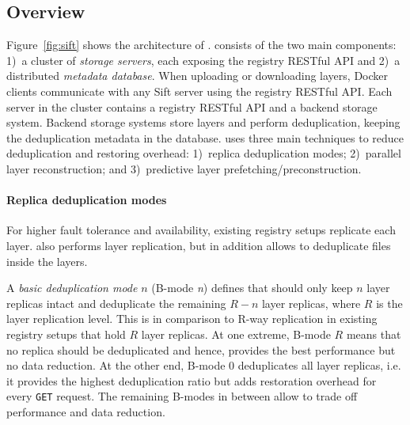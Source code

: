 \subsection{Overview}
\label{sec:overview}



Figure~\ref{fig:sift} shows the architecture of \sysname.
%
\sysname consists of the two main components: %
1)~a cluster of \emph{storage servers}, each
exposing the registry RESTful API and 2)~a distributed
\emph{metadata database}. 
%
When uploading or downloading layers, 
Docker clients communicate with any Sift
server using the registry RESTful API.
%
%
Each server in the cluster contains a registry RESTful API and a backend storage system.
%
Backend storage systems store
layers and perform deduplication, keeping the deduplication metadata in the
database.
%
%
%
\sysname uses three main techniques to reduce deduplication and restoring overhead:
1)~replica deduplication modes; 2)~parallel layer reconstruction; and
3)~predictive layer prefetching/preconstruction.




\paragraph{Replica deduplication modes}
%
For higher fault tolerance and availability, existing registry setups replicate each layer.
%
\sysname also performs layer replication, but in addition allows to deduplicate
files inside the layers.

A \emph{basic deduplication mode} $n$ (B-mode \emph{n}) defines that \sysname should only
keep $n$ layer replicas intact and deduplicate the remaining $R-n$ layer
replicas, where $R$ is the layer replication level. This is in comparison to R-way replication in existing registry setups that hold $R$ layer replicas.
%
At one extreme, B-mode $R$ means that no replica should be deduplicated and
hence, provides the best performance but no data reduction.
%
At the other end, B-mode $0$ deduplicates all layer replicas, i.e. it provides
the highest deduplication ratio but adds restoration overhead for every
\texttt{GET} request.
%
The remaining B-modes in between allow to trade off performance and data
reduction.


